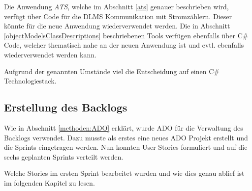 Die Anwendung \textit{ATS}, welche im Abschnitt \ref{ats} genauer beschrieben wird, verfügt über Code für die DLMS Kommunikation mit Stromzählern.
Dieser könnte für die neue Anwendung wiederverwendet werden.
Die in Abschnitt \ref{objectModelsClassDescriptions} beschriebenen Tools verfügen ebenfalls über C\# Code, welcher thematisch nahe an der neuen Anwendung ist und evtl. ebenfalls wiederverwendet werden kann.

Aufgrund der genannten Umstände viel die Entscheidung auf einen C\# Technologiestack.



\subsection{Erstellung des Backlogs}
Wie in Abschnitt \ref{methoden:ADO} erklärt, wurde \ac{ADO} für die Verwaltung des Backlogs verwendet.
Dazu musste als erstes eine neues \ac{ADO} Projekt erstellt und die Sprints eingetragen werden.
Nun konnten User Stories formuliert und auf die sechs geplanten Sprints verteilt werden.



Welche Stories im ersten Sprint bearbeitet wurden und wie dies genau ablief ist im folgenden Kapitel zu lesen.
